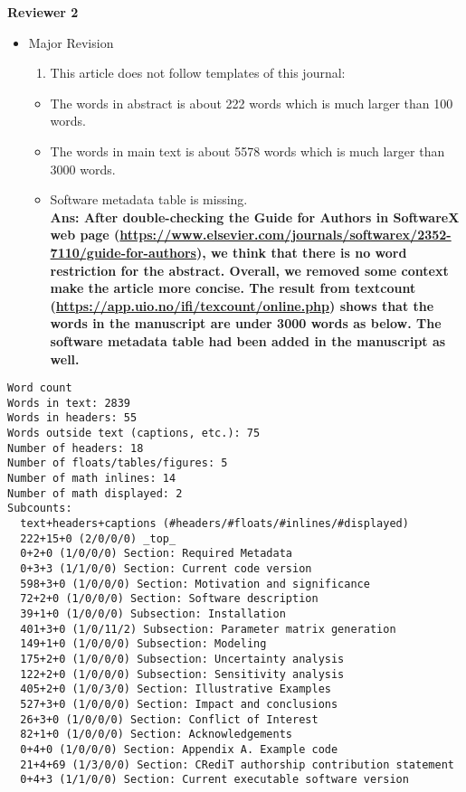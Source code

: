 \documentclass[
]{article}
\providecommand{\tightlist}{%
  \setlength{\itemsep}{0pt}\setlength{\parskip}{0pt}}
\begin{document}
\textbf{Reviewer 2}

\begin{itemize}
\item
  Major Revision

  \begin{enumerate}
  \def\labelenumi{\arabic{enumi}.}
  \tightlist
  \item
    This article does not follow templates of this journal:
  \end{enumerate}

  \begin{itemize}
  \tightlist
  \item
    The words in abstract is about 222 words which is much larger than
    100 words.
  \item
    The words in main text is about 5578 words which is much larger than
    3000 words.
  \item
    Software metadata table is missing.\\
    \textbf{Ans: After double-checking the Guide for Authors in
    SoftwareX web page
    (\url{https://www.elsevier.com/journals/softwarex/2352-7110/guide-for-authors}),
    we think that there is no word restriction for the abstract.
    Overall, we removed some context make the article more concise. The
    result from textcount
    (\url{https://app.uio.no/ifi/texcount/online.php}) shows that the
    words in the manuscript are under 3000 words as below. The software
    metadata table had been added in the manuscript as well.}
  \end{itemize}
\end{itemize}

\begin{verbatim}
Word count
Words in text: 2839
Words in headers: 55
Words outside text (captions, etc.): 75
Number of headers: 18
Number of floats/tables/figures: 5
Number of math inlines: 14
Number of math displayed: 2
Subcounts:
  text+headers+captions (#headers/#floats/#inlines/#displayed)
  222+15+0 (2/0/0/0) _top_
  0+2+0 (1/0/0/0) Section: Required Metadata
  0+3+3 (1/1/0/0) Section: Current code version
  598+3+0 (1/0/0/0) Section: Motivation and significance
  72+2+0 (1/0/0/0) Section: Software description
  39+1+0 (1/0/0/0) Subsection: Installation
  401+3+0 (1/0/11/2) Subsection: Parameter matrix generation
  149+1+0 (1/0/0/0) Subsection: Modeling
  175+2+0 (1/0/0/0) Subsection: Uncertainty analysis
  122+2+0 (1/0/0/0) Subsection: Sensitivity analysis
  405+2+0 (1/0/3/0) Section: Illustrative Examples
  527+3+0 (1/0/0/0) Section: Impact and conclusions
  26+3+0 (1/0/0/0) Section: Conflict of Interest
  82+1+0 (1/0/0/0) Section: Acknowledgements
  0+4+0 (1/0/0/0) Section: Appendix A. Example code
  21+4+69 (1/3/0/0) Section: CRediT authorship contribution statement
  0+4+3 (1/1/0/0) Section: Current executable software version
\end{verbatim}
\end{document}
